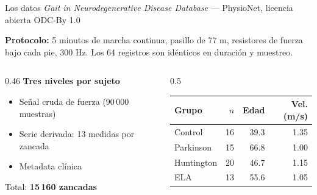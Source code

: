 \documentclass[aspectratio=169,10pt]{beamer}
\begin{document}
\begin{frame}{Los datos}
  \textit{Gait in Neurodegenerative Disease Database} — PhysioNet, licencia abierta ODC-By 1.0

  \vspace{0.8em}
  \textbf{Protocolo:} 5 minutos de marcha continua, pasillo de 77 m, resistores de fuerza bajo cada pie, 300 Hz. Los 64 registros son idénticos en duración y muestreo.

  \vspace{1em}
  \begin{columns}[T]
    \begin{column}{0.46\textwidth}
      \textbf{Tres niveles por sujeto}
      \begin{itemize}
        \item Señal cruda de fuerza (90\,000 muestras)
        \item Serie derivada: 13 medidas por zancada
        \item Metadata clínica
      \end{itemize}
      \vspace{0.5em}
      Total: \textbf{15\,160 zancadas}
    \end{column}
    \begin{column}{0.5\textwidth}
      \centering
      \small
      \begin{tabular}{lrrr}
        \toprule
        Grupo & $n$ & Edad & Vel. (m/s) \\
        \midrule
        \color{control}Control    & 16 & 39.3 & 1.35 \\
        \color{park}Parkinson  & 15 & 66.8 & 1.00 \\
        \color{hunt}Huntington & 20 & 46.7 & 1.15 \\
        \color{als}ELA        & 13 & 55.6 & 1.05 \\
        \bottomrule
      \end{tabular}
    \end{column}
  \end{columns}
\end{frame}
\end{document}
